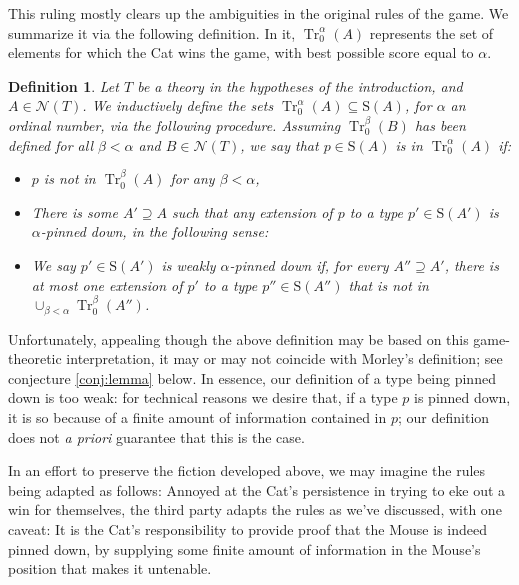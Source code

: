 \documentclass{article}
\newtheorem{definition}[theorem]{Definition}
\theoremstyle{nonumberplain}
\newcommand{\calN}{\mathcal{N}}
\newcommand{\Stone}{\mathrm{S}}
\DeclareMathOperator{\Tr}{Tr}
\begin{document}
This ruling mostly clears up the ambiguities in the original rules of the game. We summarize it via the following definition. In it, $\Tr_0^\alpha(A)$ represents the set of elements for which the Cat wins the game, with best possible score equal to $\alpha$.
\begin{definition}\label{def:tr01}
Let $T$ be a theory in the hypotheses of the introduction, and $A \in \calN(T)$. We inductively define the sets $\Tr_0^\alpha(A) \subseteq \Stone(A)$, for $\alpha$ an ordinal number, via the following procedure. Assuming $\Tr_0^\beta(B)$ has been defined for all $\beta < \alpha$ and $B \in \calN(T)$, we say that $p \in \Stone(A)$ is in $\Tr_0^\alpha(A)$ if:
\begin{itemize}
\item $p$ is not in $\Tr_0^\beta(A)$ for any $\beta < \alpha$,
\item There is some $A' \supseteq A$ such that any extension of $p$ to a type $p' \in \Stone(A')$ is $\alpha$-pinned down, in the following sense:
\item We say $p' \in \Stone(A')$ is \emph{weakly $\alpha$-pinned down} if, for every $A'' \supseteq A'$, there is at most one extension of $p'$ to a type $p'' \in \Stone(A'')$ that is not in $\cup_{\beta < \alpha} \Tr_0^\beta(A'')$.
\end{itemize}
\end{definition}

Unfortunately, appealing though the above definition may be based on this game-theoretic interpretation, it may or may not coincide with Morley's definition; see conjecture \ref{conj:lemma} below. In essence, our definition of a type being pinned down is too weak: for technical reasons we desire that, if a type $p$ is pinned down, it is so because of a finite amount of information contained in $p$; our definition does not \textit{a priori} guarantee that this is the case.

In an effort to preserve the fiction developed above, we may imagine the rules being adapted as follows: Annoyed at the Cat's persistence in trying to eke out a win for themselves, the third party adapts the rules as we've discussed, with one caveat: It is the Cat's responsibility to provide proof that the Mouse is indeed pinned down, by supplying some finite amount of information in the Mouse's position that makes it untenable.
\end{document}
